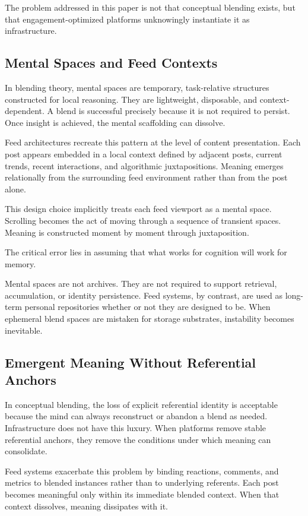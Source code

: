 \documentclass[11pt,oneside]{article}
\begin{document}
The problem addressed in this paper is not that conceptual blending exists, but that engagement-optimized platforms unknowingly instantiate it as infrastructure.

\subsection{Mental Spaces and Feed Contexts}

In blending theory, mental spaces are temporary, task-relative structures constructed for local reasoning. They are lightweight, disposable, and context-dependent. A blend is successful precisely because it is not required to persist. Once insight is achieved, the mental scaffolding can dissolve.

Feed architectures recreate this pattern at the level of content presentation. Each post appears embedded in a local context defined by adjacent posts, current trends, recent interactions, and algorithmic juxtapositions. Meaning emerges relationally from the surrounding feed environment rather than from the post alone.

This design choice implicitly treats each feed viewport as a mental space. Scrolling becomes the act of moving through a sequence of transient spaces. Meaning is constructed moment by moment through juxtaposition.

The critical error lies in assuming that what works for cognition will work for memory.

Mental spaces are not archives. They are not required to support retrieval, accumulation, or identity persistence. Feed systems, by contrast, are used as long-term personal repositories whether or not they are designed to be. When ephemeral blend spaces are mistaken for storage substrates, instability becomes inevitable.

\subsection{Emergent Meaning Without Referential Anchors}

In conceptual blending, the loss of explicit referential identity is acceptable because the mind can always reconstruct or abandon a blend as needed. Infrastructure does not have this luxury. When platforms remove stable referential anchors, they remove the conditions under which meaning can consolidate.

Feed systems exacerbate this problem by binding reactions, comments, and metrics to blended instances rather than to underlying referents. Each post becomes meaningful only within its immediate blended context. When that context dissolves, meaning dissipates with it.
\end{document}
